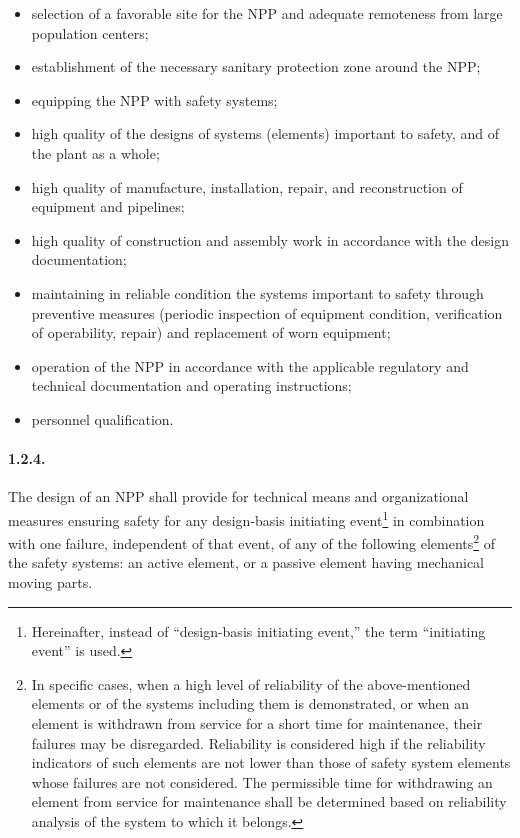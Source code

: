 \documentclass[openright]{bookest}
\begin{document}
\begin{itemize}
    \item selection of a favorable site for the NPP and adequate remoteness from large population centers;
    \item establishment of the necessary sanitary protection zone around the NPP;
    \item equipping the NPP with safety systems;
    \item high quality of the designs of systems (elements) important to safety, and of the plant as a whole;
    \item high quality of manufacture, installation, repair, and reconstruction of equipment and pipelines;
    \item high quality of construction and assembly work in accordance with the design documentation;
    \item maintaining in reliable condition the systems important to safety through preventive measures (periodic inspection of equipment condition, verification of operability, repair) and replacement of worn equipment;
    \item operation of the NPP in accordance with the applicable regulatory and technical documentation and operating instructions;
    \item personnel qualification.
\end{itemize}

\paragraph{1.2.4.}
The design of an NPP shall provide for technical means and organizational measures ensuring safety for any design-basis initiating event\footnote{Hereinafter, instead of ``design-basis initiating event,'' the term ``initiating event'' is used.} in combination with one failure, independent of that event, of any of the following elements\footnote{In specific cases, when a high level of reliability of the above-mentioned elements or of the systems including them is demonstrated, or when an element is withdrawn from service for a short time for maintenance, their failures may be disregarded. Reliability is considered high if the reliability indicators of such elements are not lower than those of safety system elements whose failures are not considered. The permissible time for withdrawing an element from service for maintenance shall be determined based on reliability analysis of the system to which it belongs.} of the safety systems: an active element, or a passive element having mechanical moving parts.
\end{document}
